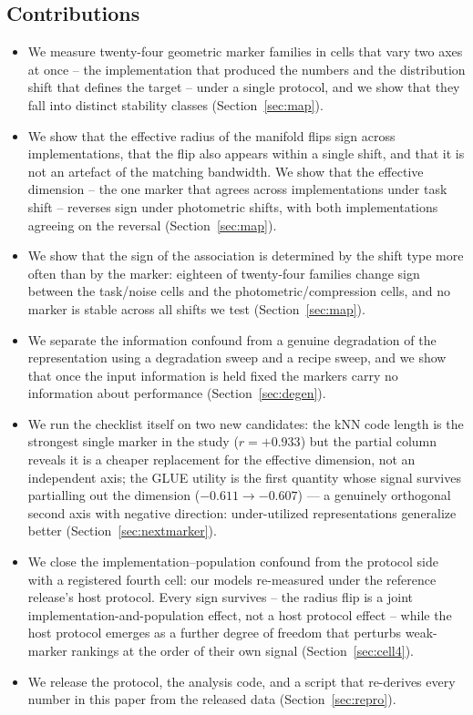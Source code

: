 \documentclass[10pt]{article}
\begin{document}
\subsection{Contributions}

\begin{itemize}
\item We measure twenty-four geometric marker families in cells that vary
      two axes at once -- the implementation that produced the numbers and
      the distribution shift that defines the target -- under a single
      protocol, and we show that they fall into distinct stability classes
      (Section~\ref{sec:map}).
\item We show that the effective radius of the manifold flips sign across
      implementations, that the flip also appears within a single shift, and
      that it is not an artefact of the matching bandwidth. We show that the
      effective dimension -- the one marker that agrees across implementations
      under task shift -- reverses sign under photometric shifts, with both
      implementations agreeing on the reversal
      (Section~\ref{sec:map}).
\item We show that the sign of the association is determined by the shift
      type more often than by the marker: eighteen of twenty-four families
      change sign between the task/noise cells and the photometric/compression
      cells, and no marker is stable across all shifts we test
      (Section~\ref{sec:map}).
\item We separate the information confound from a genuine degradation of the
      representation using a degradation sweep and a recipe sweep, and we show
      that once the input information is held fixed the markers carry no
      information about performance (Section~\ref{sec:degen}).
\item We run the checklist itself on two new candidates: the kNN code
      length is the strongest single marker in the study ($r = +0.933$) but
      the partial column reveals it is a cheaper replacement for the effective
      dimension, not an independent axis; the GLUE utility is the first
      quantity whose signal survives partialling out the dimension
      ($-0.611 \to -0.607$) --- a genuinely orthogonal second axis
      with negative direction: under-utilized representations generalize better
      (Section~\ref{sec:nextmarker}).
\item We close the implementation--population confound from the protocol
      side with a registered fourth cell: our models re-measured under the
      reference release's host protocol. Every sign survives -- the radius
      flip is a joint implementation-and-population effect, not a host
      protocol effect -- while the host protocol emerges as a further
      degree of freedom that perturbs weak-marker rankings at the order of
      their own signal (Section~\ref{sec:cell4}).
\item We release the protocol, the analysis code, and a script that re-derives
      every number in this paper from the released data (Section~\ref{sec:repro}).
\end{itemize}
\end{document}
